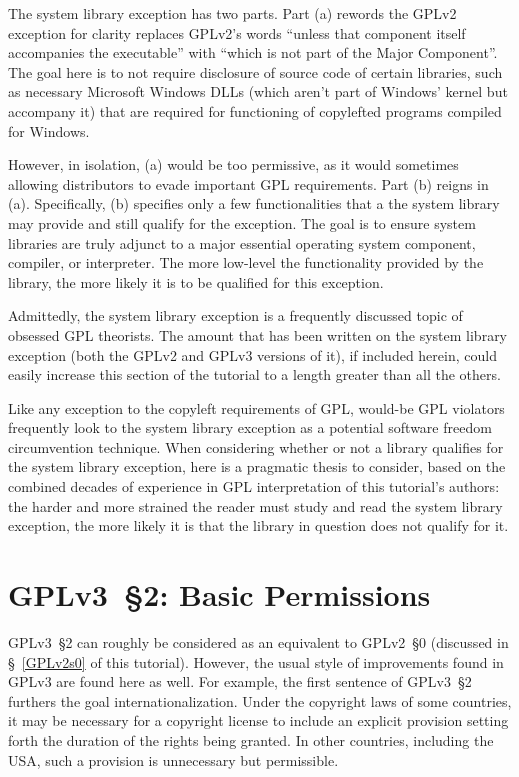 The system library exception has two parts.  Part (a) rewords the GPLv2
exception for clarity replaces GPLv2's words ``unless that component itself
accompanies the executable'' with ``which is not part of the Major
Component''.  The goal here is to not require disclosure of source code of
certain libraries, such as necessary Microsoft Windows DLLs (which aren't
part of Windows' kernel but accompany it) that are required for functioning
of copylefted programs compiled for Windows.

However, in isolation, (a) would be too permissive, as it would sometimes
allowing distributors to evade important GPL requirements.  Part (b) reigns
in (a).  Specifically, (b) specifies only a few functionalities that a the
system library may provide and still qualify for the exception.  The goal is
to ensure system libraries are truly adjunct to a major essential operating
system component, compiler, or interpreter.  The more low-level the
functionality provided by the library, the more likely it is to be qualified
for this exception.

Admittedly, the system library exception is a frequently discussed topic of
obsessed GPL theorists.  The amount that has been written on the system
library exception (both the GPLv2 and GPLv3 versions of it), if included
herein,  could easily increase this section of the tutorial to a length
greater than all the others.

Like any exception to the copyleft requirements of GPL, would-be GPL
violators frequently look to the system library exception as a potential
software freedom circumvention technique.  When considering whether or not a
library qualifies for the system library exception, here is a pragmatic
thesis to consider, based on the combined decades of experience in GPL
interpretation of this tutorial's authors: the harder and more strained the
reader must study and read the system library exception, the more likely it
is that the library in question does not qualify for it.

\section{GPLv3~\S2: Basic Permissions}

GPLv3~\S2 can roughly be considered as an equivalent to GPLv2~\S0 (discussed
in \S~\ref{GPLv2s0} of this tutorial).  However, the usual style of
improvements found in GPLv3 are found here as well.  For example, the first
sentence of GPLv3~\S2 furthers the goal internationalization.  Under the
copyright laws of some countries, it may be necessary for a copyright license
to include an explicit provision setting forth the duration of the rights
being granted. In other countries, including the USA, such a provision is
unnecessary but permissible.

